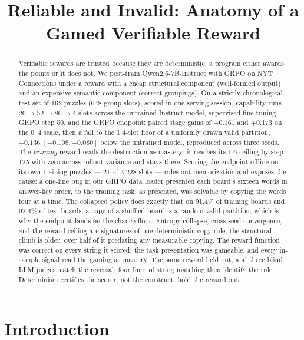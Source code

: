 \documentclass{article}
\title{Reliable and Invalid: Anatomy of a Gamed Verifiable Reward}
\begin{document}
\maketitle

\begin{abstract}
Verifiable rewards are trusted because they are deterministic: a program
either awards the points or it does not. We post-train Qwen2.5-7B-Instruct
with GRPO on NYT Connections under a reward with a cheap structural component
(well-formed output) and an expensive semantic component (correct
groupings). On a strictly chronological test set of 162 puzzles (648 group
slots), scored in one serving session, capability runs $26 \rightarrow 52
\rightarrow 80 \rightarrow 4$ slots across the untrained Instruct model,
supervised fine-tuning, GRPO step 50, and the GRPO endpoint: paired stage
gains of $+0.161$ and $+0.173$ on the
0--4 scale, then a fall to the 1.4-slot floor of a uniformly drawn valid
partition, $-0.136$ $[-0.198, -0.080]$ below the untrained model,
reproduced across three seeds. The \emph{training} reward reads the
destruction as mastery: it reaches its 1.6 ceiling by step 125 with zero
across-rollout variance and stays there. Scoring the endpoint offline on
its own training puzzles --- 21 of 3{,}228 slots --- rules out memorization
and exposes the cause: a one-line bug in our GRPO data loader presented
each board's sixteen words in answer-key order, so the training task, as
presented, was solvable by copying the words four at a time. The collapsed
policy does exactly that on 91.4\% of training boards and 92.4\% of test
boards; a copy of a shuffled board is a random valid partition, which is
why the endpoint lands on the chance floor. Entropy collapse, cross-seed
convergence, and the reward ceiling are signatures of one deterministic
copy rule; the structural climb is older, over half of it predating any
measurable copying. The reward function was correct
on every string it scored; the task presentation was gameable, and every
in-sample signal read the gaming as mastery. The same reward held out, and
three blind LLM judges, catch the reversal; four lines of string matching
then identify the rule. Determinism certifies the scorer, not the
construct: hold the reward out.
\end{abstract}

\section{Introduction}
\label{sec:intro}
\end{document}
